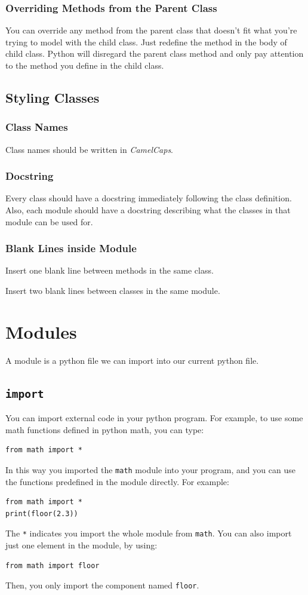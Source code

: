 \documentclass[12pt]{book}
\begin{document}
\subsection{Overriding Methods from the Parent Class}
\label{sec:orgc56e595}
You can override any method from the parent class that doesn't fit what you're trying to model with the child class. Just redefine the method in the body of child class. Python will disregard the parent class method and only pay attention to the method you define in the child class.
\section{Styling Classes}
\label{sec:org308cc59}
\subsection{Class Names}
\label{sec:org3ef1c9b}
Class names should be written in \emph{CamelCaps}.
\subsection{Docstring}
\label{sec:orgdd8b987}
Every class should have a docstring immediately following the class definition. Also, each module should have a docstring describing what the classes in that module can be used for.
\subsection{Blank Lines inside Module}
\label{sec:org9a6b187}
Insert one blank line between methods in the same class.

Insert two blank lines between classes in the same module.
\chapter{Modules}
\label{sec:orgb01b5eb}
A module is a python file we can import into our current python file.
\section{\texttt{import}}
\label{sec:orga109147}
You can import external code in your python program. For example, to use some math functions defined in python math, you can type:
\begin{verbatim}
from math import *
\end{verbatim}
In this way you imported the \texttt{math} module into your program, and you can use the functions predefined in the module directly. For example:
\begin{verbatim}
from math import *
print(floor(2.3))
\end{verbatim}
The \texttt{*} indicates you import the whole module from \texttt{math}. You can also import just one element in the module, by using:
\begin{verbatim}
from math import floor
\end{verbatim}
Then, you only import the component named \texttt{floor}.
\end{document}
